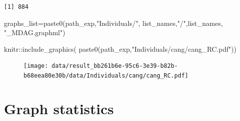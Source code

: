\documentclass[
  letterpaper,
  DIV=11,
  numbers=noendperiod]{scrreprt}
\newenvironment{Shaded}{}{}
\newcommand{\FunctionTok}[1]{\textcolor[rgb]{0.38,0.69,0.94}{#1}}
\newcommand{\NormalTok}[1]{\textcolor[rgb]{0.67,0.70,0.75}{#1}}
\newcommand{\OtherTok}[1]{\textcolor[rgb]{0.15,0.68,0.38}{#1}}
\newcommand{\SpecialCharTok}[1]{\textcolor[rgb]{0.34,0.71,0.76}{#1}}
\newcommand{\StringTok}[1]{\textcolor[rgb]{0.60,0.76,0.47}{#1}}
\begin{document}
\begin{verbatim}
[1] 884
\end{verbatim}

\begin{Shaded}
\begin{Highlighting}[]
\NormalTok{graphs\_list}\OtherTok{=}\FunctionTok{paste0}\NormalTok{(path\_exp,}\StringTok{"Individuals/"}\NormalTok{,}
\NormalTok{                   list\_names,}\StringTok{"/"}\NormalTok{,list\_names,}
                   \StringTok{"\_MDAG.graphml"}\NormalTok{)}
\end{Highlighting}
\end{Shaded}

\begin{Shaded}
\begin{Highlighting}[]
\NormalTok{knitr}\SpecialCharTok{::}\FunctionTok{include\_graphics}\NormalTok{(}
  \FunctionTok{paste0}\NormalTok{(path\_exp,}\StringTok{"Individuals/cang/cang\_RC.pdf"}\NormalTok{))}
\end{Highlighting}
\end{Shaded}

\begin{figure}[H]

{\centering \texttt{[image: data/result\_bb261b6e-95c6-3e39-b82b-b68eea80e30b/data/Individuals/cang/cang\_RC.pdf]}

}

\end{figure}

\hypertarget{graph-statistics}{%
\section{Graph statistics}\label{graph-statistics}}
\end{document}

